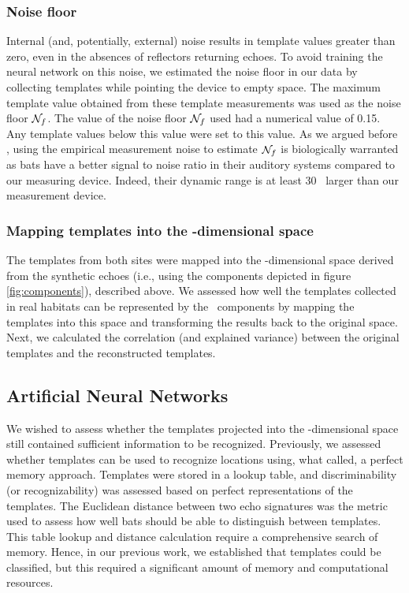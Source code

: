 \documentclass[preprint,5p]{elsarticle}
\begin{document}
\subsubsection{Noise floor}

Internal (and, potentially, external) noise results in template values greater than zero, even in the absences of reflectors returning echoes. To avoid training the neural network on this noise, we estimated the noise floor in our data by collecting templates while pointing the device to empty space. The maximum template value obtained from these template measurements was used as the noise floor $\mathcal{N}_f$. The value of the noise floor $\mathcal{N}_f$ used had a numerical value of 0.15. Any template values below this value were set to this value. As we argued before \citep{Vanderelst2016}, using the empirical measurement noise to estimate $\mathcal{N}_f$ is biologically warranted as bats have a better signal to noise ratio in their auditory systems compared to our measuring device. Indeed, their dynamic range is at least 30 \db\ larger than our measurement device.

\subsubsection{Mapping templates into the \pca-dimensional space}

The templates from both sites were mapped into the \pca-dimensional space derived from the synthetic echoes (i.e., using the components depicted in figure \ref{fig:components}), described above. We assessed how well the templates collected in real habitats can be represented by the \pca\ components by mapping the templates into this space and transforming the results back to the original space. Next, we calculated the correlation (and explained variance) between the original templates and the reconstructed templates.

\subsection{Artificial Neural Networks}

We wished to assess whether the templates projected into the \pca-dimensional space still contained sufficient information to be recognized. Previously, we assessed whether templates can be used to recognize locations using, what \citet{Baddeley2012} called, a perfect memory approach. Templates were stored in a lookup table, and discriminability (or recognizability) was assessed based on perfect representations of the templates. The Euclidean distance between two echo signatures was the metric used to assess how well bats should be able to distinguish between templates. This table lookup and distance calculation require a comprehensive search of memory. Hence, in our previous work, we established that templates could be classified, but this required a significant amount of memory and computational resources.
\end{document}
